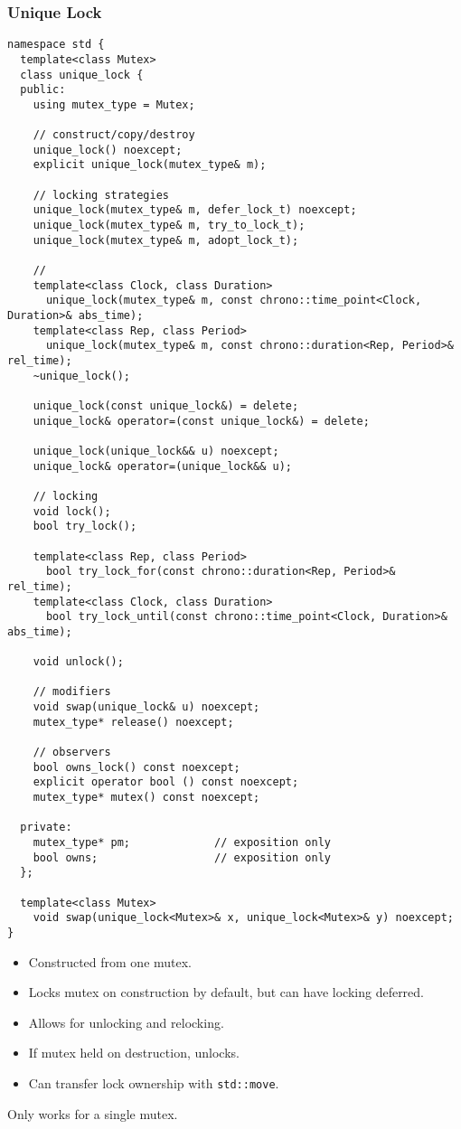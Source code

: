 \subsubsection{Unique Lock}
\begin{verbatim}
namespace std {
  template<class Mutex>
  class unique_lock {
  public:
    using mutex_type = Mutex;
  
    // construct/copy/destroy
    unique_lock() noexcept;
    explicit unique_lock(mutex_type& m);

    // locking strategies
    unique_lock(mutex_type& m, defer_lock_t) noexcept;
    unique_lock(mutex_type& m, try_to_lock_t);
    unique_lock(mutex_type& m, adopt_lock_t);

    //
    template<class Clock, class Duration>
      unique_lock(mutex_type& m, const chrono::time_point<Clock, Duration>& abs_time);
    template<class Rep, class Period>
      unique_lock(mutex_type& m, const chrono::duration<Rep, Period>& rel_time);
    ~unique_lock();
  
    unique_lock(const unique_lock&) = delete;
    unique_lock& operator=(const unique_lock&) = delete;
  
    unique_lock(unique_lock&& u) noexcept;
    unique_lock& operator=(unique_lock&& u);
  
    // locking
    void lock();
    bool try_lock();
  
    template<class Rep, class Period>
      bool try_lock_for(const chrono::duration<Rep, Period>& rel_time);
    template<class Clock, class Duration>
      bool try_lock_until(const chrono::time_point<Clock, Duration>& abs_time);
  
    void unlock();
  
    // modifiers
    void swap(unique_lock& u) noexcept;
    mutex_type* release() noexcept;
  
    // observers
    bool owns_lock() const noexcept;
    explicit operator bool () const noexcept;
    mutex_type* mutex() const noexcept;
  
  private:
    mutex_type* pm;             // exposition only
    bool owns;                  // exposition only
  };
  
  template<class Mutex>
    void swap(unique_lock<Mutex>& x, unique_lock<Mutex>& y) noexcept;
}
\end{verbatim}
\begin{itemize}
  \item Constructed from one mutex.
  \item Locks mutex on construction by default, but can have locking deferred.
  \item Allows for unlocking and relocking.
  \item If mutex held on destruction, unlocks.
  \item Can transfer lock ownership with \texttt{std::move}.
\end{itemize}
\begin{consbox}
  Only works for a single mutex.
\end{consbox}

